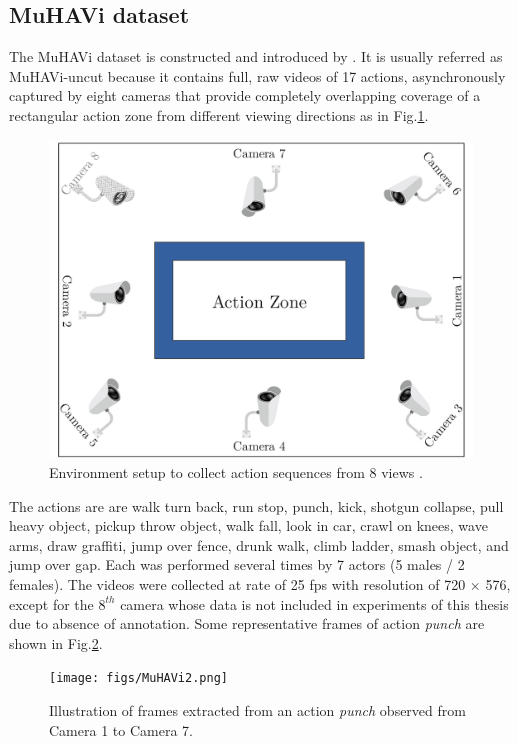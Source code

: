 
\subsection{MuHAVi dataset}
    The MuHAVi dataset is constructed and introduced by \cite{murtaza2016multi}. It is usually referred as MuHAVi-uncut because it contains full, raw videos of 17 actions, asynchronously captured by eight cameras that provide completely overlapping coverage of a rectangular action zone from different viewing directions as in Fig.\ref{Fig:MuHAVi1}. 

    \begin{figure}[h]
        \centering
        \includegraphics[width=0.8\linewidth]{figs/MuHAVi1.png}
        \caption{Environment setup to collect action sequences from 8 views \cite{murtaza2016multi}.}
        \label{Fig:MuHAVi1}
    \end{figure}

    The actions are are walk turn back, run stop, punch, kick, shotgun collapse, pull heavy object, pickup throw object, walk fall, look in car, crawl on knees, wave arms, draw graffiti, jump over fence, drunk walk, climb ladder, smash object, and jump over gap. 
    Each was performed several times by 7 actors (5 males / 2 females). 
    The videos were collected at rate of 25 fps with resolution of 720 $\times$ 576, except for the $8^{th}$ camera whose data is not included in experiments of this thesis due to absence of annotation.
    Some representative frames of action \textit{punch} are shown in Fig.\ref{Fig:MuHAVi2}.

    \begin{figure}[htbp]
        \centering
        \texttt{[image: figs/MuHAVi2.png]}
        \caption{Illustration of frames extracted from an action \textit{punch} observed from Camera 1 to Camera 7.}
        \label{Fig:MuHAVi2}
    \end{figure}
